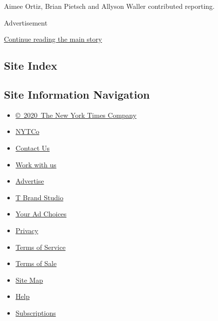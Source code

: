 Aimee Ortiz, Brian Pietsch and Allyson Waller contributed reporting.

Advertisement

\protect\hyperlink{after-bottom}{Continue reading the main story}

\hypertarget{site-index}{%
\subsection{Site Index}\label{site-index}}

\hypertarget{site-information-navigation}{%
\subsection{Site Information
Navigation}\label{site-information-navigation}}

\begin{itemize}
\tightlist
\item
  \href{https://help.nytimes3xbfgragh.onion/hc/en-us/articles/115014792127-Copyright-notice}{©~2020~The
  New York Times Company}
\end{itemize}

\begin{itemize}
\tightlist
\item
  \href{https://www.nytco.com/}{NYTCo}
\item
  \href{https://help.nytimes3xbfgragh.onion/hc/en-us/articles/115015385887-Contact-Us}{Contact
  Us}
\item
  \href{https://www.nytco.com/careers/}{Work with us}
\item
  \href{https://nytmediakit.com/}{Advertise}
\item
  \href{http://www.tbrandstudio.com/}{T Brand Studio}
\item
  \href{https://www.nytimes3xbfgragh.onion/privacy/cookie-policy\#how-do-i-manage-trackers}{Your
  Ad Choices}
\item
  \href{https://www.nytimes3xbfgragh.onion/privacy}{Privacy}
\item
  \href{https://help.nytimes3xbfgragh.onion/hc/en-us/articles/115014893428-Terms-of-service}{Terms
  of Service}
\item
  \href{https://help.nytimes3xbfgragh.onion/hc/en-us/articles/115014893968-Terms-of-sale}{Terms
  of Sale}
\item
  \href{https://spiderbites.nytimes3xbfgragh.onion}{Site Map}
\item
  \href{https://help.nytimes3xbfgragh.onion/hc/en-us}{Help}
\item
  \href{https://www.nytimes3xbfgragh.onion/subscription?campaignId=37WXW}{Subscriptions}
\end{itemize}
